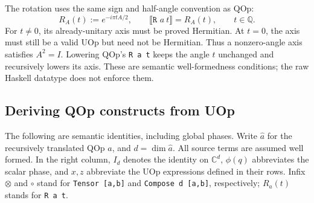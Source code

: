 \documentclass[11pt,a4paper]{article}
\newcommand{\C}{\mathbb C}
\newcommand{\Q}{\mathbb Q}
\newcommand{\sem}[1]{\llbracket #1\rrbracket}
\newcommand{\code}[1]{\texttt{#1}}
\newcommand{\Rot}[2]{R_{#1}(#2)}
\newcommand{\Ph}[1]{\phi(#1)}
\begin{document}
The rotation uses the same sign and half-angle convention as QOp:
\[
  \Rot A t:=e^{-i\pi tA/2},\qquad
  \sem{\code{R }a\ t}=\Rot A t,\qquad t\in\Q.
\]
For $t\ne0$, its already-unitary axis must be proved Hermitian.
At $t=0$, the axis must still be a valid UOp but need not be Hermitian.
Thus a nonzero-angle axis satisfies $A^2=I$.
Lowering QOp's \code{R a t} keeps the angle $t$ unchanged and recursively
lowers its axis. These are semantic well-formedness conditions; the raw
Haskell datatype does not enforce them.

\clearpage
\subsection{Deriving QOp constructs from UOp}
\label{sec:qop-lowering}

The following are semantic identities, including global phases. Write
$\widehat a$ for the recursively translated QOp $a$, and
$d=\dim\widehat a$. All source terms are assumed well formed.
In the right column, $I_d$ denotes the identity on $\C^d$,
$\Ph q$ abbreviates the scalar phase, and $x,z$ abbreviate the UOp
expressions defined in their rows. Infix $\otimes$ and $\circ$ stand
for \code{Tensor [a,b]} and \code{Compose d [a,b]}, respectively;
$R_a(t)$ stands for \code{R a t}.
\end{document}
